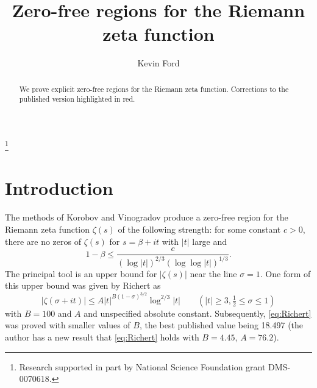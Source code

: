 \documentclass[10pt]{amsart}
\theoremstyle{remark}
\theoremstyle{plain}
\numberwithin{equation}{section}
\theoremstyle{definition}
\newcommand{\be}{\begin{equation}}
\newcommand{\rev}[1]{{\color{red}#1}}
\begin{document}
 

\title{Zero-free regions for the Riemann zeta function} 
\author{Kevin Ford}
\begin{abstract}
We prove explicit zero-free regions for the Riemann zeta function.
{\rev{Corrections to the published version highlighted in red.}}
\end{abstract}

\thanks{Research supported in part by National Science Foundation grant
DMS-0070618.}

\address{Department of Mathematics, University of South Carolina,
Columbia, SC 29208,  USA} 
 
\maketitle 

\section{Introduction}\label{sec:intro}               %

The methods of Korobov \cite{Ko} and Vinogradov \cite{V}
produce a zero-free region
for the Riemann zeta function $\zeta(s)$ of the following strength: for
some constant $c>0$, there
are no zeros of $\zeta(s)$ for $s=\beta+it$ with $|t|$ large and
\be
1 - \beta \le \frac{c}{(\log |t|)^{2/3}(\log\log |t|)^{1/3}}.
\label{eq:VK}
\end{equation}
The principal tool is an upper bound for $|\zeta(s)|$ near the line
$\sigma=1$.  One form of this upper bound was given by Richert \cite{Ri} as
\be
|\zeta(\sigma+it)| \le A |t|^{B(1-\sigma)^{3/2}} \log^{2/3} |t|
\qquad (|t|\ge 3, \tfrac12 \le \sigma \le 1) \label{eq:Richert}
\end{equation}
with $B=100$ and $A$ and unspecified absolute constant.
Subsequently, \eqref{eq:Richert} was proved with smaller values of $B$,
the best published value
being 18.497 \cite{Ku} (the author has a new
result \cite{F} that \eqref{eq:Richert} holds with $B=4.45$, $A=76.2$). 
\end{document}
